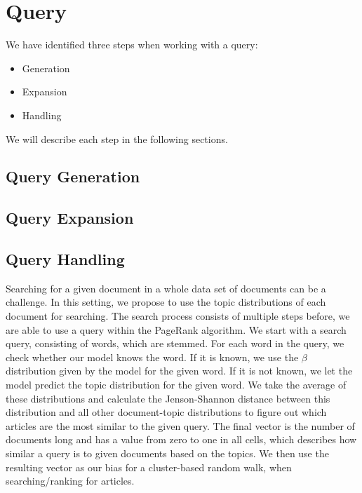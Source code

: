 \section{Query}
We have identified three steps when working with a query:
\begin{itemize}
	\item Generation
	\item Expansion
	\item Handling
\end{itemize}

We will describe each step in the following sections.


\subsection{Query Generation}


\subsection{Query Expansion}


\subsection{Query Handling}
Searching for a given document in a whole data set of documents can be a challenge. 
In this setting, we propose to use the topic distributions of each document for searching.
The search process consists of multiple steps before, we are able to use a query within the PageRank algorithm. 
We start with a search query, consisting of words, which are stemmed.
For each word in the query, we check whether our model knows the word.
If it is known, we use the $\beta$ distribution given by the model for the given word. 
If it is not known, we let the model predict the topic distribution for the given word.
We take the average of these distributions and calculate the Jenson-Shannon distance between this distribution and all other document-topic distributions to figure out which articles are the most similar to the given query.
The final vector is the number of documents long and has a value from zero to one in all cells, which describes how similar a query is to given documents based on the topics.
We then use the resulting vector as our bias for a cluster-based random walk, when searching/ranking for articles.
 

